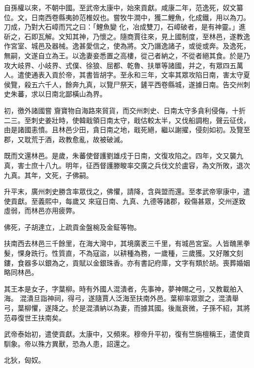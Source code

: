 \begin{pinyinscope}
 自孫權以來，不朝中國。至武帝太康中，始來貢獻。咸康二年，范逸死，奴文纂位。文，日南西卷縣夷帥范椎奴也。嘗牧牛澗中，獲二鯉魚，化成鐵，用以為刀。刀成，乃對大石嶂而咒之曰：「鯉魚變
 化，冶成雙刀，石嶂破者，是有神靈。」進斫之，石即瓦解。文知其神，乃懷之。隨商賈往來，見上國制度，至林邑，遂教逸作宮室、城邑及器械。逸甚愛信之，使為將。文乃譖逸諸子，或徙或奔。及逸死，無嗣，文遂自立為王。以逸妻妾悉置之高樓，從己者納之，不從者絕其食。於是乃攻大岐界、小岐界、式僕、徐狼、屈都、乾魯、扶單等諸國，并之，有眾四五萬人。遣使通表入貢於帝，其書皆胡字。至永和三年，文率其眾攻陷日南，害太守夏侯覽，殺五六千人，餘奔九真，以覽尸祭天，鏟平西卷縣城，遂據日南。告交州刺史朱蕃，求以日南北鄙橫山為界。



 初，徼外諸國嘗
 齎寶物自海路來貿貨，而交州刺史、日南太守多貪利侵侮，十折二三。至刺史姜壯時，使韓戢領日南太守，戢估較太半，又伐船調枹，聲云征伐，由是諸國恚憤。且林邑少田，貪日南之地，戢死絕，繼以謝擢，侵刻如初。及覽至郡，又耽荒于酒，政教愈亂，故被破滅。



 既而文還林邑。是歲，朱蕃使督護劉雄戍于日南，文復攻陷之。四年，文又襲九真，害士庶十八九。明年，征西督護滕畯率交廣之兵伐文於盧容，為文所敗，退次九真。其年，文死，子佛嗣。



 升平末，廣州刺史勝含率眾伐之，佛懼，請降，含與盟而還。至孝武帝寧康中，遣使貢獻。至義熙中，每歲又
 來寇日南、九真、九德等諸郡，殺傷甚眾，交州遂致虛弱，而林邑亦用疲弊。



 佛死，子胡達立，上疏貢金盤椀及金鉦等物。



 扶南西去林邑三千餘里，在海大灣中，其境廣袤三千里，有城邑宮室。人皆醜黑拳髮，惈身跣行。性質直，不為寇盜，以耕種為務，一歲種，三歲獲。又好雕文刻鏤，食器多以銀為之，貢賦以金銀珠香。亦有書記府庫，文字有類於胡。喪葬婚姻略同林邑。



 其王本是女子，字葉柳。時有外國人混潰者，先事神，夢神賜之弓，又教載舶入海。
 混潰旦詣神祠，得弓，遂隨賈人泛海至扶南外邑。葉柳率眾禦之，混潰舉弓，葉柳懼，遂降之。於是混潰納以為妻，而據其國。後胤衰微，子孫不紹，其將范尋復世王扶南矣。



 武帝泰始初，遣使貢獻。太康中，又頻來。穆帝升平初，復有竺旃檀稱王，遣使貢馴象。帝以殊方異獸，恐為人患，詔還之。



 北狄，匈奴。




\end{pinyinscope}
